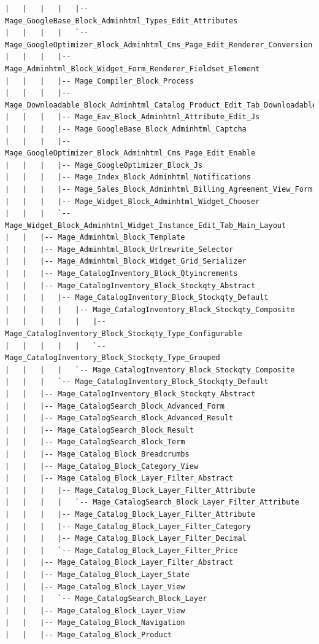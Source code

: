 \documentclass[oneside]{book}
\begin{document}
\begin{lstlisting}
|   |   |   |   |-- Mage_GoogleBase_Block_Adminhtml_Types_Edit_Attributes
|   |   |   |   `-- Mage_GoogleOptimizer_Block_Adminhtml_Cms_Page_Edit_Renderer_Conversion
|   |   |   |-- Mage_Adminhtml_Block_Widget_Form_Renderer_Fieldset_Element
|   |   |   |-- Mage_Compiler_Block_Process
|   |   |   |-- Mage_Downloadable_Block_Adminhtml_Catalog_Product_Edit_Tab_Downloadable_Links
|   |   |   |-- Mage_Eav_Block_Adminhtml_Attribute_Edit_Js
|   |   |   |-- Mage_GoogleBase_Block_Adminhtml_Captcha
|   |   |   |-- Mage_GoogleOptimizer_Block_Adminhtml_Cms_Page_Edit_Enable
|   |   |   |-- Mage_GoogleOptimizer_Block_Js
|   |   |   |-- Mage_Index_Block_Adminhtml_Notifications
|   |   |   |-- Mage_Sales_Block_Adminhtml_Billing_Agreement_View_Form
|   |   |   |-- Mage_Widget_Block_Adminhtml_Widget_Chooser
|   |   |   `-- Mage_Widget_Block_Adminhtml_Widget_Instance_Edit_Tab_Main_Layout
|   |   |-- Mage_Adminhtml_Block_Template
|   |   |-- Mage_Adminhtml_Block_Urlrewrite_Selector
|   |   |-- Mage_Adminhtml_Block_Widget_Grid_Serializer
|   |   |-- Mage_CatalogInventory_Block_Qtyincrements
|   |   |-- Mage_CatalogInventory_Block_Stockqty_Abstract
|   |   |   |-- Mage_CatalogInventory_Block_Stockqty_Default
|   |   |   |   |-- Mage_CatalogInventory_Block_Stockqty_Composite
|   |   |   |   |   |-- Mage_CatalogInventory_Block_Stockqty_Type_Configurable
|   |   |   |   |   `-- Mage_CatalogInventory_Block_Stockqty_Type_Grouped
|   |   |   |   `-- Mage_CatalogInventory_Block_Stockqty_Composite
|   |   |   `-- Mage_CatalogInventory_Block_Stockqty_Default
|   |   |-- Mage_CatalogInventory_Block_Stockqty_Abstract
|   |   |-- Mage_CatalogSearch_Block_Advanced_Form
|   |   |-- Mage_CatalogSearch_Block_Advanced_Result
|   |   |-- Mage_CatalogSearch_Block_Result
|   |   |-- Mage_CatalogSearch_Block_Term
|   |   |-- Mage_Catalog_Block_Breadcrumbs
|   |   |-- Mage_Catalog_Block_Category_View
|   |   |-- Mage_Catalog_Block_Layer_Filter_Abstract
|   |   |   |-- Mage_Catalog_Block_Layer_Filter_Attribute
|   |   |   |   `-- Mage_CatalogSearch_Block_Layer_Filter_Attribute
|   |   |   |-- Mage_Catalog_Block_Layer_Filter_Attribute
|   |   |   |-- Mage_Catalog_Block_Layer_Filter_Category
|   |   |   |-- Mage_Catalog_Block_Layer_Filter_Decimal
|   |   |   `-- Mage_Catalog_Block_Layer_Filter_Price
|   |   |-- Mage_Catalog_Block_Layer_Filter_Abstract
|   |   |-- Mage_Catalog_Block_Layer_State
|   |   |-- Mage_Catalog_Block_Layer_View
|   |   |   `-- Mage_CatalogSearch_Block_Layer
|   |   |-- Mage_Catalog_Block_Layer_View
|   |   |-- Mage_Catalog_Block_Navigation
|   |   |-- Mage_Catalog_Block_Product

\end{lstlisting}
\end{document}
